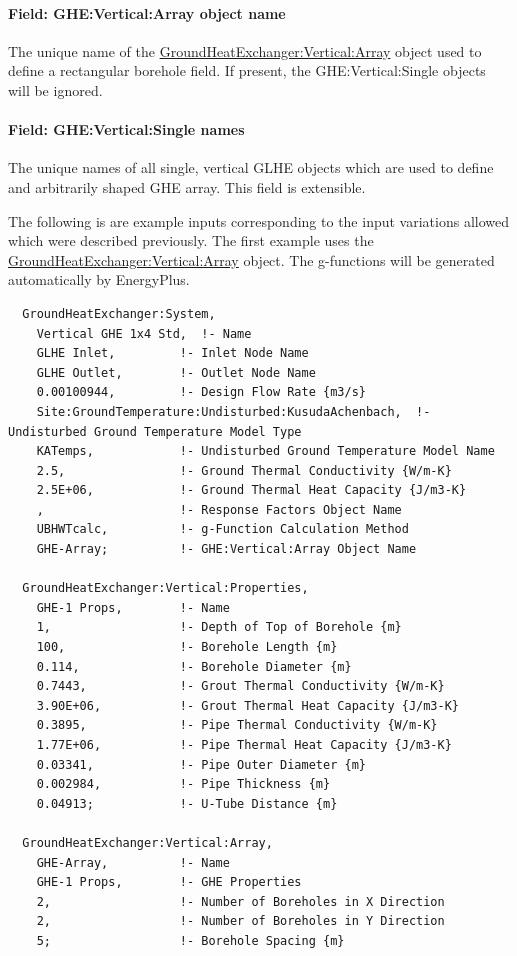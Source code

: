 \paragraph{Field: GHE:Vertical:Array object name}

The unique name of the \hyperref[groundheatexchangerverticalarray]{GroundHeatExchanger:Vertical:Array} object used to define a rectangular borehole field. If present, the GHE:Vertical:Single objects will be ignored.

\paragraph{Field: GHE:Vertical:Single names}

The unique names of all single, vertical GLHE objects which are used to define and arbitrarily shaped GHE array. This field is extensible.

The following is are example inputs corresponding to the input variations allowed which were described previously. The first example uses the \hyperref[groundheatexchangerverticalarray]{GroundHeatExchanger:Vertical:Array} object. The g-functions will be generated automatically by EnergyPlus.

\begin{lstlisting}
  GroundHeatExchanger:System,
    Vertical GHE 1x4 Std,  !- Name
    GLHE Inlet,         !- Inlet Node Name
    GLHE Outlet,        !- Outlet Node Name
    0.00100944,         !- Design Flow Rate {m3/s}
    Site:GroundTemperature:Undisturbed:KusudaAchenbach,  !- Undisturbed Ground Temperature Model Type
    KATemps,            !- Undisturbed Ground Temperature Model Name
    2.5,                !- Ground Thermal Conductivity {W/m-K}
    2.5E+06,            !- Ground Thermal Heat Capacity {J/m3-K}
    ,                   !- Response Factors Object Name
    UBHWTcalc,          !- g-Function Calculation Method
    GHE-Array;          !- GHE:Vertical:Array Object Name

  GroundHeatExchanger:Vertical:Properties,
    GHE-1 Props,        !- Name
    1,                  !- Depth of Top of Borehole {m}
    100,                !- Borehole Length {m}
    0.114,              !- Borehole Diameter {m}
    0.7443,             !- Grout Thermal Conductivity {W/m-K}
    3.90E+06,           !- Grout Thermal Heat Capacity {J/m3-K}
    0.3895,             !- Pipe Thermal Conductivity {W/m-K}
    1.77E+06,           !- Pipe Thermal Heat Capacity {J/m3-K}
    0.03341,            !- Pipe Outer Diameter {m}
    0.002984,           !- Pipe Thickness {m}
    0.04913;            !- U-Tube Distance {m}

  GroundHeatExchanger:Vertical:Array,
    GHE-Array,          !- Name
    GHE-1 Props,        !- GHE Properties
    2,                  !- Number of Boreholes in X Direction
    2,                  !- Number of Boreholes in Y Direction
    5;                  !- Borehole Spacing {m}
\end{lstlisting}

